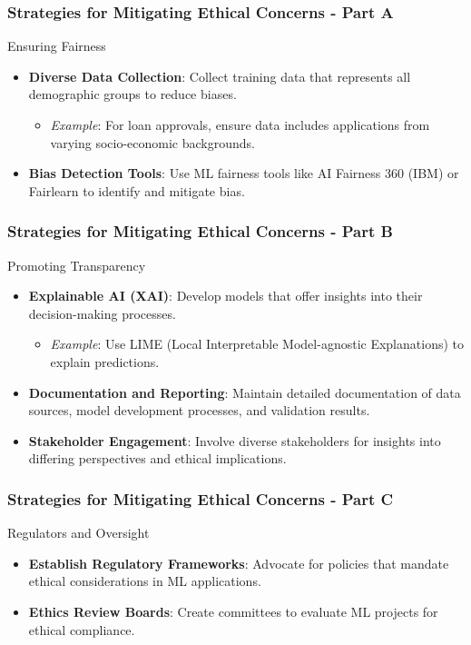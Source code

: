 \documentclass[aspectratio=169]{beamer}
\begin{document}
\begin{frame}[fragile]
    \frametitle{Strategies for Mitigating Ethical Concerns - Part A}
    \begin{block}{Ensuring Fairness}
        \begin{itemize}
            \item \textbf{Diverse Data Collection}: Collect training data that represents all demographic groups to reduce biases.
                \begin{itemize}
                    \item \textit{Example}: For loan approvals, ensure data includes applications from varying socio-economic backgrounds.
                \end{itemize}
            \item \textbf{Bias Detection Tools}: Use ML fairness tools like AI Fairness 360 (IBM) or Fairlearn to identify and mitigate bias.
        \end{itemize}
    \end{block}
\end{frame}

\begin{frame}[fragile]
    \frametitle{Strategies for Mitigating Ethical Concerns - Part B}
    \begin{block}{Promoting Transparency}
        \begin{itemize}
            \item \textbf{Explainable AI (XAI)}: Develop models that offer insights into their decision-making processes.
                \begin{itemize}
                    \item \textit{Example}: Use LIME (Local Interpretable Model-agnostic Explanations) to explain predictions.
                \end{itemize}
            \item \textbf{Documentation and Reporting}: Maintain detailed documentation of data sources, model development processes, and validation results.
            \item \textbf{Stakeholder Engagement}: Involve diverse stakeholders for insights into differing perspectives and ethical implications.
        \end{itemize}
    \end{block}
\end{frame}

\begin{frame}[fragile]
    \frametitle{Strategies for Mitigating Ethical Concerns - Part C}
    \begin{block}{Regulators and Oversight}
        \begin{itemize}
            \item \textbf{Establish Regulatory Frameworks}: Advocate for policies that mandate ethical considerations in ML applications.
            \item \textbf{Ethics Review Boards}: Create committees to evaluate ML projects for ethical compliance.
        \end{itemize}
    \end{block}
\end{frame}
\end{document}
